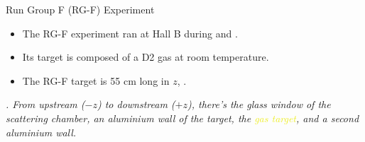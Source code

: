 \begin{frame}{Run Group F (RG-F) Experiment}
    \label{10.41::rgf_experiment}

    \begin{itemize}
        \item
            The RG-F experiment ran at Hall B during  and .

        \vspace{12pt}
        \item
            Its target is composed of a D2 gas at room temperature.

        \vspace{12pt}
        \item
            The RG-F target is 55 cm long in $z$, .
    \end{itemize}

    \vspace{-6pt}

    \begin{center}
        \begin{figure}[t]
        \end{figure}
    \end{center}

    \vspace{-6pt}

    \scriptsize{\textit{
        .
        From upstream ($-z$) to downstream ($+z$), there's the glass window of the scattering chamber, an aluminium wall of the target, the \textcolor[HTML]{edee23}{gas target}, and a second aluminium wall.
    }}
\end{frame}
